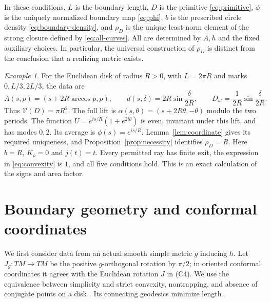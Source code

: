 \documentclass[11pt]{article}
\theoremstyle{remark}
\newtheorem{example}[theorem]{Example}
\newcommand{\Varea}{\mathcal V}
\begin{document}
In these conditions, $L$ is the boundary length, $D$ is the primitive
\eqref{eq:primitive}, $\phi$ is the uniquely normalized boundary map
\eqref{eq:phi}, $b$ is the prescribed circle density
\eqref{eq:boundary-density}, and $\rho_D$ is the unique least-norm
element of the strong closure defined by \eqref{eq:all-curves}.
All are determined by $A,h$ and the fixed auxiliary choices. In particular,
the universal construction of $\rho_D$ is distinct from the conclusion
that a realizing metric exists.

\begin{example}\label{ex:euclidean}
For the Euclidean disk of radius $R>0$, with $L=2\pi R$ and marks
$0,L/3,2L/3$, the data are
\[
 A(s,p)=(s+2R\arccos p,p),\qquad
 d(s,\delta)=2R\sin\frac\delta{2R},\qquad
 D_{st}=\frac1{2R}\sin\frac\delta{2R}.
\]
Thus $\Varea(D)=\pi R^2$. The full lift is
$\alpha(s,\theta)=(s+2R\theta,-\theta)$ modulo the two periods.
The function $U=e^{is/R}(1+e^{2i\theta})$ is even, invariant under this
lift, and has modes $0,2$. Its average is $\phi(s)=e^{is/R}$.
Lemma~\ref{lem:coordinate} gives its required uniqueness, and
Proposition~\ref{prop:necessity} identifies $\rho_D=R$.
Here $b=R$, $K_\rho=0$ and $j(t)=t$. Every permitted ray has finite
exit, the expression in \eqref{eq:convexity} is $1$, and all five
conditions hold. This is an exact calculation of the signs and area factor.
\end{example}

\section{Boundary geometry and conformal coordinates}\label{sec:boundary}
We first consider data from an actual smooth simple metric $g$ inducing
$h$. Let $J_g:TM\to TM$ be the positive $g$-orthogonal rotation by
$\pi/2$; in oriented conformal coordinates it agrees with the Euclidean
rotation $J$ in (C4). We use the equivalence between simplicity and strict convexity,
nontrapping, and absence of conjugate points on a disk
\cite[Theorem~3.8.2]{PSU}. Its connecting geodesics minimize length
\cite[Proposition~3.8.4]{PSU}.
\end{document}

